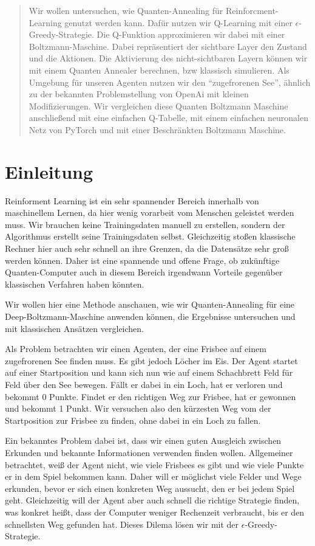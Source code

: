 \begin{abstract}
Wir wollen untersuchen, wie Quanten-Annealing für Reinforcment-Learning genutzt werden kann. Dafür nutzen wir Q-Learning mit einer $\epsilon$-Greedy-Strategie. Die Q-Funktion approximieren wir dabei mit einer Boltzmann-Maschine. Dabei repräsentiert der sichtbare Layer den Zustand und die Aktionen. Die Aktivierung des nicht-sichtbaren Layern können wir mit einem Quanten Annealer berechnen, bzw klassisch simulieren. Als Umgebung für unseren Agenten nutzen wir den ``zugefrorenen See'', ähnlich zu der bekannten Problemstellung von OpenAi mit kleinen Modifizierungen. Wir vergleichen diese Quanten Boltzmann Maschine anschließend mit eine einfachen Q-Tabelle, mit einem einfachen neuronalen Netz von PyTorch und mit einer Beschränkten Boltzmann Maschine.
\end{abstract}

\section{Einleitung }
\label{sec:int}

Reinforment Learning ist ein sehr spannender Bereich innerhalb von maschinellem Lernen, da hier wenig vorarbeit vom Menschen geleistet werden muss. Wir brauchen keine Trainingsdaten manuell zu erstellen, sondern der Algorithmus erstellt seine Trainingsdaten selbst. Gleichzeitig stoßen klassische Rechner hier auch sehr schnell an ihre Grenzen, da die Datensätze sehr groß werden können. Daher ist eine spannende und offene Frage, ob zukünftige Quanten-Computer auch in diesem Bereich irgendwann Vorteile gegenüber klassischen Verfahren haben könnten.

Wir wollen hier eine Methode anschauen, wie wir Quanten-Annealing für eine Deep-Boltzmann-Maschine anwenden können, die Ergebnisse untersuchen und mit klassischen Ansätzen vergleichen.

Als Problem betrachten wir einen Agenten, der eine Frisbee auf einem zugefrorenen See finden muss. Es gibt jedoch Löcher im Eis. Der Agent startet auf einer Startposition und kann sich nun wie auf einem Schachbrett Feld für Feld über den See bewegen. Fällt er dabei in ein Loch, hat er verloren und bekommt 0 Punkte. Findet er den richtigen Weg zur Frisbee, hat er gewonnen und bekommt 1 Punkt. Wir versuchen also den kürzesten Weg vom der Startposition zur Frisbee zu finden, ohne dabei in ein Loch zu fallen.

Ein bekanntes Problem dabei ist, dass wir einen guten Ausgleich zwischen Erkunden und bekannte Informationen verwenden finden wollen. Allgemeiner betrachtet, weiß der Agent nicht, wie viele Frisbees es gibt und wie viele Punkte er in dem Spiel bekommen kann. Daher will er möglichst viele Felder und Wege erkunden, bevor er sich einen konkreten Weg aussucht, den er bei jedem Spiel geht. Gleichzeitig will der Agent aber auch schnell die richtige Strategie finden, was konkret heißt, dass der Computer weniger Rechenzeit verbraucht, bis er den schnellsten Weg gefunden hat. Dieses Dilema lösen wir mit der $\epsilon$-Greedy-Strategie.

